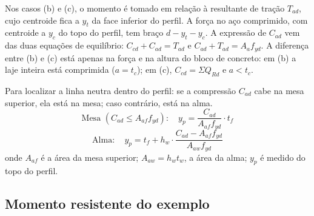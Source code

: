 \documentclass[11pt,a4paper]{article}
\begin{document}
Nos casos (b) e (c), o momento é tomado em relação à resultante de tração $T_{ad}$, cujo centroide fica a $y_t$ da face inferior do perfil. A força no aço comprimido, com centroide a $y_c$ do topo do perfil, tem braço $d - y_t - y_c$. A expressão de $C_{ad}$ vem das duas equações de equilíbrio: $C_{cd} + C_{ad} = T_{ad}$ e $C_{ad} + T_{ad} = A_a f_{yd}$. A diferença entre (b) e (c) está apenas na força e na altura do bloco de concreto: em (b) a laje inteira está comprimida ($a = t_c$); em (c), $C_{cd} = \Sigma Q_{Rd}$ e $a < t_c$.

Para localizar a linha neutra dentro do perfil: se a compressão $C_{ad}$ cabe na mesa superior, ela está na mesa; caso contrário, está na alma.
\begin{equation}
  \text{Mesa } (C_{ad} \le A_{af} f_{yd}): \quad y_p = \frac{C_{ad}}{A_{af} f_{yd}}\cdot t_f
  \label{eq:yp-mesa}
\end{equation}
\begin{equation}
  \text{Alma}: \quad y_p = t_f + h_w\cdot\frac{C_{ad} - A_{af} f_{yd}}{A_{aw} f_{yd}}
  \label{eq:yp-alma}
\end{equation}
onde $A_{af}$ é a área da mesa superior; $A_{aw} = h_w t_w$, a área da alma; $y_p$ é medido do topo do perfil.

\subsection{Momento resistente do exemplo}
\end{document}
